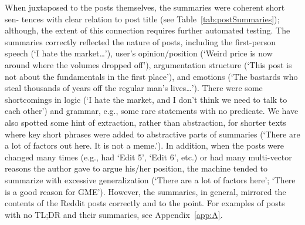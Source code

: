 When juxtaposed to the posts themselves, the summaries were coherent short sen- tences with clear relation to post title (see Table~\cref{tab:postSummaries}); although, the extent of this connection requires further automated testing. The summaries correctly reflected the nature of posts, including the first-person speech (‘I hate the market…’), user’s opinion/position (‘Weird price is now around where the volumes dropped off’), argumentation structure (‘This post is not about the fundamentals in the first place’), and emotions (‘The bastards who steal thousands of years off the regular man’s lives…’). There were some shortcomings in logic (‘I hate the market, and I don’t think we need to talk to each other’) and grammar, e.g., some rare statements with no predicate. We have also spotted some hint of extraction, rather than abstraction, for shorter texts where key short phrases were added to abstractive parts of summaries (‘There are a lot of factors out here. It is not a meme.’). In addition, when the posts were changed many times (e.g., had ‘Edit 5’, ‘Edit 6’, etc.) or had many multi-vector reasons the author gave to argue his/her position, the machine tended to summarize with excessive generalization (‘There are a lot of factors here’; ‘There is a good reason for GME’). However, the summaries, in general, mirrored the contents of the Reddit posts correctly and to the point. For examples of posts with no TL;DR and their summaries, see Appendix~\cref{app:A}.

